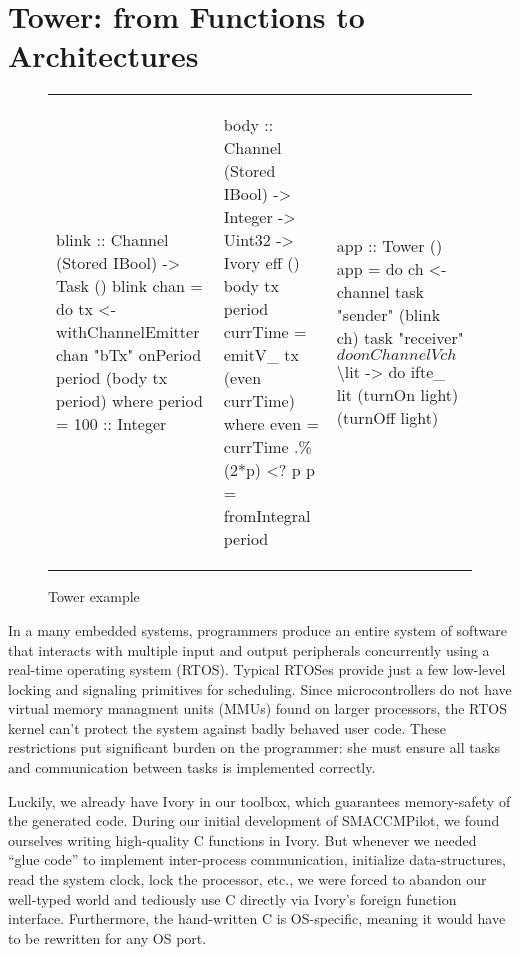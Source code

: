 \section{Tower: from Functions to Architectures}
\label{sec:tower}

\begin{figure*}
  \begin{tabular}{p{}|p{}|p{}}
    \begin{smcode}

blink :: Channel (Stored IBool)
      -> Task ()
blink chan = do
  tx <- withChannelEmitter chan "bTx"
  onPeriod period (body tx period)
  where
  period = 100 :: Integer
    \end{smcode} & \begin{smcode}
body :: Channel (Stored IBool)
     -> Integer
     -> Uint32
     -> Ivory eff ()
body tx period currTime = emitV\_ tx (even currTime)
  where
  even = currTime .\% (2*p) <? p
  p    = fromIntegral period
    \end{smcode} & \begin{smcode}
app :: Tower ()
app = do
  ch <- channel
  task "sender" (blink ch)
  task "receiver" $ do
    onChannelV ch $ \textbackslash{}lit -> do
      ifte\_ lit (turnOn light)
                (turnOff light)
    \end{smcode}
  \end{tabular}
  \caption{Tower example}
\end{figure*}

In a many embedded systems, programmers produce an entire system of software
that interacts with multiple input and output peripherals concurrently using a
real-time operating system (RTOS). Typical RTOSes provide just a few low-level
locking and signaling primitives for scheduling. Since microcontrollers do not
have virtual memory managment units (MMUs) found on larger processors, the RTOS
kernel can't protect the system against badly behaved user code. These
restrictions put significant burden on the programmer: she must ensure all tasks
and communication between tasks is implemented correctly.

Luckily, we already have Ivory in our toolbox, which guarantees memory-safety of
the generated code. During our initial development of SMACCMPilot, we found
ourselves writing high-quality C functions in Ivory.  But whenever we needed
``glue code'' to implement inter-process communication, initialize
data-structures, read the system clock, lock the processor, etc., we were forced
to abandon our well-typed world and tediously use C directly via Ivory's foreign
function interface.  Furthermore, the hand-written C is OS-specific, meaning it
would have to be rewritten for any OS port.

